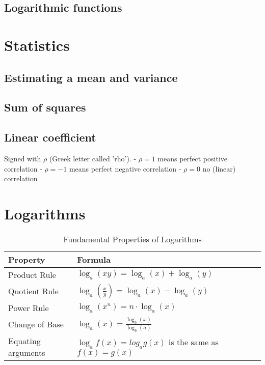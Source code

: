 \documentclass{article}
\begin{document}
\subsection{Logarithmic functions}
\section{Statistics}
\subsection{Estimating a mean and variance}
\subsection{Sum of squares}
\subsection{Linear coefficient}
Signed with $\rho$ (Greek letter called 'rho').
- $\rho = 1$ means perfect positive correlation
- $\rho = -1$ means perfect negative correlation
- $\rho = 0$ no (linear) correlation
\section{Logarithms}
\begin{table}[htbp]
\centering
\begin{tabular}{|l|l|}
\hline
\textbf{Property} & \textbf{Formula} \\
\hline
Product Rule & $\log_a(xy) = \log_a(x) + \log_a(y)$ \\
\hline
Quotient Rule & $\log_a\left(\frac{x}{y}\right) = \log_a(x) - \log_a(y)$ \\
\hline
Power Rule & $\log_a(x^n) = n \cdot \log_a(x)$ \\
\hline
Change of Base & $\log_a(x) = \frac{\log_b(x)}{\log_b(a)}$ \\
\hline
Equating arguments & $\log_af(x) = log_ag(x)$ is the same as $f(x) = g(x)$ \\
\hline
\end{tabular}
\caption{Fundamental Properties of Logarithms}
\label{tab:log_properties}
\end{table}
\end{document}
